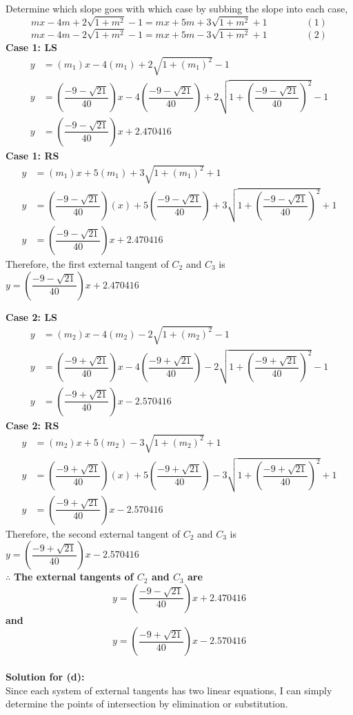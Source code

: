 \documentclass[12pt]{book}
\begin{document}
\begin{enumerate}
Determine which slope goes with which case by subbing the slope into each case,
$$mx - 4m + 2\sqrt{1+m^{2}} - 1 = mx + 5m + 3\sqrt{1+m^{2}}+1 \qquad \qquad (1)$$
$$mx - 4m - 2\sqrt{1+m^{2}} - 1 = mx + 5m - 3\sqrt{1+m^{2}}+1 \qquad \qquad (2)$$
\textbf{Case 1: LS}
\begin{align}
    y &= (m_1)x - 4(m_1) + 2\sqrt{1+(m_1)^{2}} - 1 \\
    y &= \left(\dfrac{-9- \sqrt{21}}{40}\right)x - 4\left(\dfrac{-9- \sqrt{21}}{40}\right) +2\sqrt{1+\left(\dfrac{-9- \sqrt{21}}{40}\right)^2} -1 \\
    y &= \left(\dfrac{-9- \sqrt{21}}{40}\right)x + 2.470416
\end{align}
\textbf{Case 1: RS}
\begin{align}
    y &= (m_1)x + 5(m_1) + 3\sqrt{1+(m_1)^{2}}+1 \\
    y &=  \left(\dfrac{-9- \sqrt{21}}{40}\right)(x)+5\left(\dfrac{-9- \sqrt{21}}{40}\right)+3\sqrt{1+ \left(\dfrac{-9- \sqrt{21}}{40}\right)^2}+1 \\
    y &= \left(\dfrac{-9- \sqrt{21}}{40}\right)x + 2.470416
\end{align}
Therefore, the first external tangent of $C_2$ and $C_3$ is $y = \left(\dfrac{-9- \sqrt{21}}{40}\right)x + 2.470416$

\textbf{Case 2: LS}
\begin{align}
    y &= (m_2)x - 4(m_2) - 2\sqrt{1+(m_2)^{2}} - 1 \\
    y &= \left(\dfrac{-9+ \sqrt{21}}{40}\right)x - 4\left(\dfrac{-9+ \sqrt{21}}{40}\right) - 2\sqrt{1+\left(\dfrac{-9+ \sqrt{21}}{40}\right)^{2}} - 1 \\
    y &= \left(\dfrac{-9+ \sqrt{21}}{40}\right)x - 2.570416
\end{align}
\textbf{Case 2: RS}
\begin{align}
    y &= (m_2)x + 5(m_2) - 3\sqrt{1+(m_2)^{2}}+1 \\
    y &= \left(\dfrac{-9+ \sqrt{21}}{40}\right)(x)+5\left(\dfrac{-9+ \sqrt{21}}{40}\right)-3\sqrt{1+ \left(\dfrac{-9+ \sqrt{21}}{40}\right)^2}+1 \\
    y &= \left(\dfrac{-9+ \sqrt{21}}{40}\right)x - 2.570416
\end{align}
Therefore, the second external tangent of $C_2$ and $C_3$  is $y = \left(\dfrac{-9+ \sqrt{21}}{40}\right)x - 2.570416$\\

$\therefore$ \textbf{The external tangents of $C_2$ and $C_3$ are } $$y=\left(\dfrac{-9- \sqrt{21}}{40}\right)x + 2.470416$$  \textbf{and} $$y=\left(\dfrac{-9+ \sqrt{21}}{40}\right)x - 2.570416$$\\
\setcounter{equation}{0}
\textbf{Solution for (d):}\\
Since each system of external tangents has two linear equations, I can simply determine the points of intersection by elimination or substitution.\\


\end{enumerate}
\end{document}
